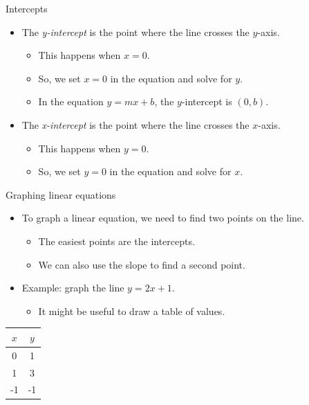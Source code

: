 \documentclass[
  10pt,
  ignorenonframetext,
]{beamer}
\providecommand{\tightlist}{%
  \setlength{\itemsep}{0pt}\setlength{\parskip}{0pt}}\usepackage{longtable,booktabs,array}
\begin{document}
\begin{frame}{Intercepts}
\label{intercepts}
\begin{itemize}
\tightlist
\item
  The \emph{y-intercept} is the point where the line crosses the
  \(y\)-axis.

  \begin{itemize}
  \tightlist
  \item
    This happens when \(x = 0\).
  \item
    So, we set \(x = 0\) in the equation and solve for \(y\).
  \item
    In the equation \(y = mx + b\), the \(y\)-intercept is \((0, b)\).
  \end{itemize}
\item
  The \emph{x-intercept} is the point where the line crosses the
  \(x\)-axis.

  \begin{itemize}
  \tightlist
  \item
    This happens when \(y = 0\).
  \item
    So, we set \(y = 0\) in the equation and solve for \(x\).
  \end{itemize}
\end{itemize}
\end{frame}

\begin{frame}{Graphing linear equations}
\label{graphing-linear-equations}
\begin{itemize}
\tightlist
\item
  To graph a linear equation, we need to find two points on the line.

  \begin{itemize}
  \tightlist
  \item
    The easiest points are the intercepts.
  \item
    We can also use the slope to find a second point.
  \end{itemize}
\item
  Example: graph the line \(y = 2x + 1\).

  \begin{itemize}
  \tightlist
  \item
    It might be useful to draw a table of values.
  \end{itemize}
\end{itemize}

\begin{table}[h]
\centering
\begin{tabular}{c|c}
$x$ & $y$ \\
\hline
0 & 1 \\
1 & 3 \\
-1 & -1
\end{tabular}
\end{table}
\end{frame}
\end{document}
